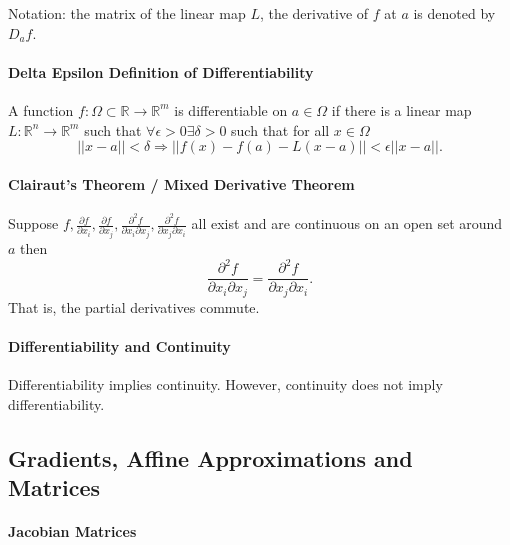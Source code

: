 Notation: the matrix of the linear map \(L\), the derivative of \(f\) at
\(a\) is denoted by \(D_af\).

\paragraph{Delta Epsilon Definition of Differentiability}
A function \(f: \Omega\subset \mathbb{R}\to \mathbb{R}^m\) is 
differentiable on \(a\in \Omega\) if there is a linear map \(L: \mathbb{R}^n\to \mathbb{R}^m\)
such that \(\forall \epsilon > 0 \exists \delta > 0 \)
such that for all \(x\in \Omega\)
\[
\left|\left|x - a\right|\right| < \delta
\Rightarrow
\left|\left|f(x) - f(a) - L(x-a)\right|\right|
< \epsilon\left|\left|x - a\right|\right|. 
\]

\paragraph{Clairaut's Theorem / Mixed Derivative Theorem}
Suppose \(
f, \frac{\partial f}{\partial x_i}, \frac{\partial f}{\partial x_j},
    \frac{\partial^2 f}{\partial x_i \partial x_j},
    \frac{\partial^2 f}{\partial x_j \partial x_i}
\)
all exist and are continuous on an open set around \(a\) then
\[
    \frac{\partial^2 f}{\partial x_i \partial x_j}
    =
    \frac{\partial^2 f}{\partial x_j \partial x_i}.
\]
That is, the partial derivatives commute.

\paragraph{Differentiability and Continuity} Differentiability implies continuity.
However, continuity does not imply differentiability.

\subsection{Gradients, Affine Approximations and Matrices}

\paragraph{Jacobian Matrices}



% 
